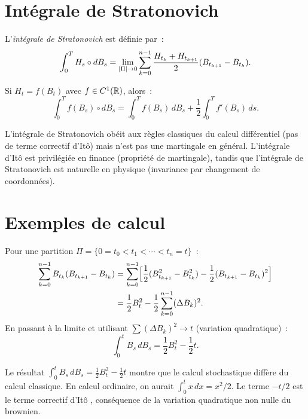 \section{Int\'egrale de Stratonovich}

\begin{definition}
L'\emph{int\'egrale de Stratonovich} est d\'efinie par~:
\[
  \int_0^T H_s \circ dB_s = \lim_{\left| \Pi \right| \to 0}
  \sum_{k=0}^{n-1} \frac{H_{t_k} + H_{t_{k+1}}}{2} (B_{t_{k+1}} - B_{t_k}).
\]
\end{definition}

\begin{proposition}
Si $H_t = f(B_t)$ avec $f \in C^1(\mathbb{R})$, alors~:
\[
  \int_0^T f(B_s) \circ dB_s = \int_0^T f(B_s) \, dB_s
  + \frac{1}{2} \int_0^T f'(B_s) \, ds.
\]
\end{proposition}

\begin{remarque}
L'int\'egrale de Stratonovich ob\'eit aux r\`egles classiques du calcul diff\'erentiel
(pas de terme correctif d'It\^o) mais n'est pas une martingale en g\'en\'eral.
L'int\'egrale d'It\^o est privil\'egi\'ee en finance (propri\'et\'e de martingale),
tandis que l'int\'egrale de Stratonovich est naturelle en physique (invariance
par changement de coordonn\'ees).
\end{remarque}

\section{Exemples de calcul}

\begin{exemple}[$\int_0^t B_s \, dB_s$]
Pour une partition $\Pi = \{0 = t_0 < t_1 < \cdots < t_n = t\}$~:
\begin{align*}
  \sum_{k=0}^{n-1} B_{t_k}(B_{t_{k+1}} - B_{t_k})
  &= \sum_{k=0}^{n-1} \Bigl[\frac{1}{2}(B_{t_{k+1}}^2 - B_{t_k}^2)
    - \frac{1}{2}(B_{t_{k+1}} - B_{t_k})^2\Bigr] \\
  &= \frac{1}{2} B_t^2 - \frac{1}{2} \sum_{k=0}^{n-1} (\Delta B_k)^2.
\end{align*}
En passant \`a la limite et utilisant $\sum (\Delta B_k)^2 \to t$ (variation
quadratique)~:
\[
  \int_0^t B_s \, dB_s = \frac{1}{2} B_t^2 - \frac{1}{2} t.
\]
\end{exemple}

\begin{attention}[title=\textbf{Le terme $-t/2$}]
Le r\'esultat $\int_0^t B_s \, dB_s = \frac{1}{2}B_t^2 - \frac{1}{2}t$ montre que
le calcul stochastique diff\`ere du calcul classique. En calcul ordinaire, on aurait
$\int_0^t x \, dx = x^2/2$. Le terme $-t/2$ est le \og terme correctif d'It\^o \fg,
cons\'equence de la variation quadratique non nulle du brownien.
\end{attention}

